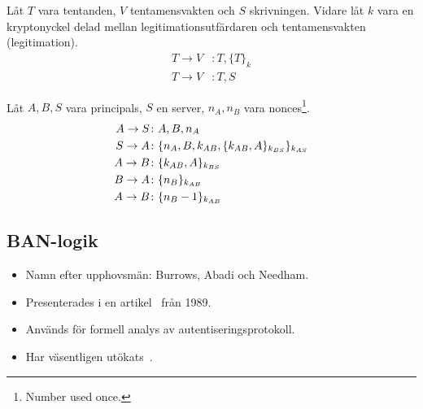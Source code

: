 \begin{frame}
  \begin{example}
    Låt \(T\) vara tentanden, \(V\) tentamensvakten och \(S\) skrivningen.
    Vidare låt \(k\) vara en kryptonyckel delad mellan legitimationsutfärdaren 
    och tentamensvakten (legitimation).
    \begin{align*}
      T\to V&\colon T, \{T\}_k \\
      T\to V&\colon T, S
    \end{align*}
  \end{example}
\end{frame}

\begin{frame}
  \begin{example}
    Låt \(A, B, S\) vara principals, \(S\) en server, \(n_A, n_B\) vara 
    nonces\footnote{Number used once.}.
    \begin{align*}
      A\to S &\colon A, B, n_A \\
      S\to A &\colon \{n_A, B, k_{AB}, \{k_{AB}, 
      A\}_{k_{BS}}\}_{k_{AS}} \\
      A\to B &\colon \{k_{AB}, A\}_{k_{BS}} \\
      B\to A &\colon \{n_B\}_{k_{AB}} \\
      A\to B &\colon \{n_B-1\}_{k_{AB}}
    \end{align*}
  \end{example}
\end{frame}

\subsection{BAN-logik}

\begin{frame}
  \begin{itemize}
    \item Namn efter upphovsmän: Burrows, Abadi och Needham.
    \item Presenterades i en artikel~\cite{BAN90alo} från 1989.
    \item Används för formell analys av autentiseringsprotokoll.
    \item Har väsentligen utökats~\cite{Syverson2001tlo}.
  \end{itemize}
\end{frame}

